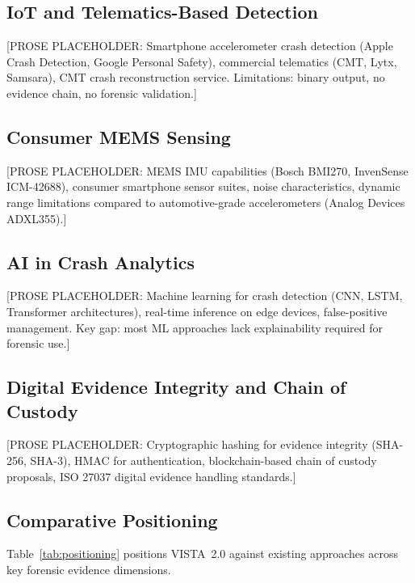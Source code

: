 \documentclass[conference,twocolumn]{IEEEtran}
\begin{document}
\subsection{IoT and Telematics-Based Detection}

[PROSE PLACEHOLDER: Smartphone accelerometer crash detection (Apple Crash Detection, Google Personal Safety), commercial telematics (CMT, Lytx, Samsara), CMT crash reconstruction service. Limitations: binary output, no evidence chain, no forensic validation.]

\subsection{Consumer MEMS Sensing}

[PROSE PLACEHOLDER: MEMS IMU capabilities (Bosch BMI270, InvenSense ICM-42688), consumer smartphone sensor suites, noise characteristics, dynamic range limitations compared to automotive-grade accelerometers (Analog Devices ADXL355).]

\subsection{AI in Crash Analytics}

[PROSE PLACEHOLDER: Machine learning for crash detection (CNN, LSTM, Transformer architectures), real-time inference on edge devices, false-positive management. Key gap: most ML approaches lack explainability required for forensic use.]

\subsection{Digital Evidence Integrity and Chain of Custody}

[PROSE PLACEHOLDER: Cryptographic hashing for evidence integrity (SHA-256, SHA-3), HMAC for authentication, blockchain-based chain of custody proposals, ISO 27037 digital evidence handling standards.]

\subsection{Comparative Positioning}

Table~\ref{tab:positioning} positions VISTA~2.0 against existing approaches across key forensic evidence dimensions.
\end{document}
